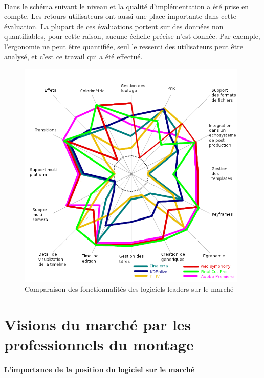   \paragraph{}
  Dans le schéma suivant le niveau et la qualité d'implémentation a été prise en compte. Les
  retours utilisateurs ont aussi une place importante dans cette évaluation. La plupart de ces
  évaluations portent sur des données non quantifiables, pour cette raison, aucune échelle précise n'est donnée.
  Par exemple, l'ergonomie ne peut être quantifiée, seul le ressenti des utilisateurs peut être analysé,
  et c'est ce travail qui a été effectué.

  \begin{figure}
      \begin{center}
        \includegraphics[width=0.98\textwidth]{images/spiderDiagramFeaturesComparision}
      \end{center}
      \caption{Comparaison des fonctionnalités des logiciels leaders sur le marché}
      \label{Yes}
  \end{figure}

\newpage
\section{Visions du marché par les professionnels du montage}

  \paragraph{L'importance de la position du logiciel sur le marché}

